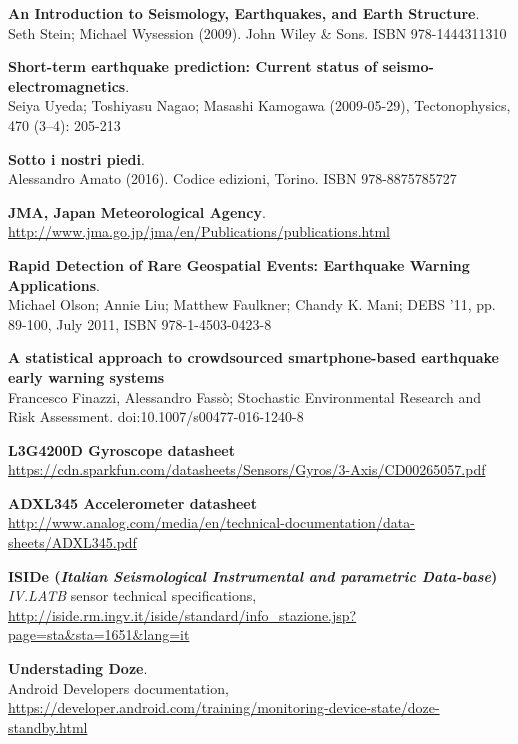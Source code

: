 \documentclass[a4paper,10pt]{memoir}
\begin{document}
\begin{thebibliography}{9}

	\textbf{An Introduction to Seismology, Earthquakes, and Earth Structure}. \\
	Seth Stein; Michael Wysession (2009). John Wiley \& Sons. ISBN 978-1444311310

	\textbf{Short-term earthquake prediction: Current status of seismo-electromagnetics}. \\
	Seiya Uyeda; Toshiyasu Nagao; Masashi Kamogawa (2009-05-29), Tectonophysics, 470 (3–4): 205-213

	\textbf{Sotto i nostri piedi}. \\
	Alessandro Amato (2016). Codice edizioni, Torino. ISBN 978-8875785727

	\textbf{JMA, Japan Meteorological Agency}. \\
	\url{http://www.jma.go.jp/jma/en/Publications/publications.html}

	\textbf{Rapid Detection of Rare Geospatial Events: Earthquake Warning Applications}. \\
	Michael Olson; Annie Liu; Matthew Faulkner; Chandy K. Mani; DEBS '11, pp. 89-100, July 2011, ISBN 978-1-4503-0423-8

	\textbf{A statistical approach to crowdsourced smartphone-based earthquake early warning systems} \\
	Francesco Finazzi, Alessandro Fassò; Stochastic Environmental Research and Risk Assessment.  doi:10.1007/s00477-016-1240-8

	\textbf{L3G4200D Gyroscope datasheet} \\
	\url{https://cdn.sparkfun.com/datasheets/Sensors/Gyros/3-Axis/CD00265057.pdf}

	\textbf{ADXL345 Accelerometer datasheet} \\
	\url{http://www.analog.com/media/en/technical-documentation/data-sheets/ADXL345.pdf}

	\textbf{ISIDe (\textit{Italian Seismological Instrumental and parametric Data-base})} \\
	\textit{IV.LATB} sensor technical specifications, \url{http://iside.rm.ingv.it/iside/standard/info_stazione.jsp?page=sta&sta=1651&lang=it}

	\textbf{Understading Doze}. \\
	Android Developers documentation, \url{https://developer.android.com/training/monitoring-device-state/doze-standby.html}


\end{thebibliography}
\end{document}
